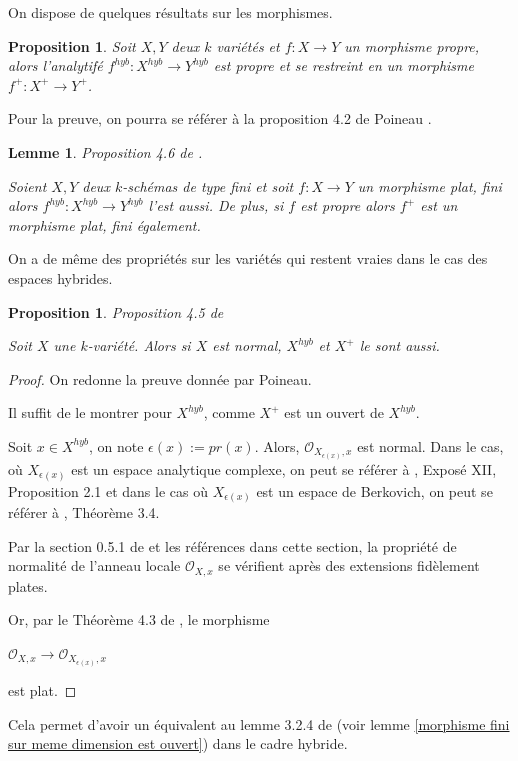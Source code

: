 \documentclass[11pt]{article}
\newtheorem{prop}[thm]{Proposition}
\newtheorem{lem}[thm]{Lemme}
\begin{document}
On dispose de quelques résultats sur les morphismes.

\begin{prop}
Soit $X, Y$ deux $k$ variétés et $f : X \rightarrow Y$ un morphisme propre, alors l'analytifé $f^{hyb} : X^{hyb} \rightarrow Y^{hyb}$ est propre et se restreint en un morphisme $f^+ : X^+ \rightarrow Y^+$.
\end{prop}

Pour la preuve, on pourra se référer à la proposition 4.2 de Poineau \cite{PoineauCompactificationHybride}.

\begin{lem}Proposition 4.6 de \cite{PoineauCompactificationHybride}. \label{morphisme analytifié garde les propriétés}

Soient $X,Y$ deux $k$-schémas de type fini et soit $f : X \rightarrow Y$ un morphisme plat, fini alors $f^{hyb} : X^{hyb} \rightarrow Y^{hyb}$ l'est aussi. De plus, si $f$ est propre alors $f^+$ est un morphisme plat, fini également.
\end{lem}

On a de même des propriétés sur les variétés qui restent vraies dans le cas des espaces hybrides.

\begin{prop} Proposition 4.5 de \cite{PoineauCompactificationHybride} \label{normalité se préserve par espaces hybrides}

Soit $X$ une $k$-variété. Alors si $X$ est normal, $X^{hyb}$ et $X^+$ le sont aussi.
\end{prop}

\begin{proof}On redonne la preuve donnée par Poineau.

Il suffit de le montrer pour $X^{hyb}$, comme $X^+$ est un ouvert de $X^{hyb}$. 

Soit $x\in X^{hyb}$, on note $\epsilon(x) := pr(x)$. Alors, $\mathcal{O}_{X_{\epsilon(x)},x}$ est normal. Dans le cas, où $X_{\epsilon(x)}$ est un espace analytique complexe, on peut se référer à \cite{SGA}, Exposé XII, Proposition 2.1 et dans le cas où $X_{\epsilon(x)}$ est un espace de Berkovich, on peut se référer à \cite{DucrosEspacesBerkoExcellents}, Théorème 3.4. 

Par la section 0.5.1 de \cite{DucrosEspacesBerkoExcellents} et les références dans cette section, la propriété de normalité de l'anneau locale $\mathcal{O}_{X,x}$ se vérifient après des extensions fidèlement plates.

Or, par le Théorème 4.3 de \cite{Berger}, le morphisme
\begin{center}
$\mathcal{O}_{X,x} \rightarrow \mathcal{O}_{X_{\epsilon(x)},x}$
\end{center}
est plat.
\end{proof}
Cela permet d'avoir un équivalent au lemme 3.2.4 de \cite{BerkovichLivre} (voir lemme \ref{morphisme fini sur meme dimension est ouvert}) dans le cadre hybride.
\end{document}
